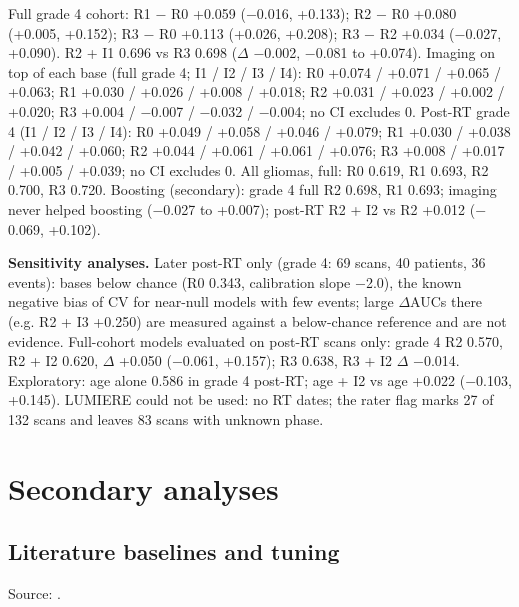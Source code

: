 \documentclass[11pt,a4paper]{article}
\begin{document}
Full grade 4 cohort: R1 $-$ R0 +0.059 ($-$0.016, +0.133); R2 $-$ R0 +0.080 (+0.005, +0.152); R3 $-$ R0 +0.113
(+0.026, +0.208); R3 $-$ R2 +0.034 ($-$0.027, +0.090). R2 + I1 0.696 vs R3 0.698 ($\Delta$ $-$0.002, $-$0.081
to +0.074). Imaging on top of each base (full grade 4; I1 / I2 / I3 / I4): R0 +0.074 / +0.071 / +0.065 /
+0.063; R1 +0.030 / +0.026 / +0.008 / +0.018; R2 +0.031 / +0.023 / +0.002 / +0.020; R3 +0.004 / $-$0.007 /
$-$0.032 / $-$0.004; no CI excludes 0. Post-RT grade 4 (I1 / I2 / I3 / I4): R0 +0.049 / +0.058 / +0.046 /
+0.079; R1 +0.030 / +0.038 / +0.042 / +0.060; R2 +0.044 / +0.061 / +0.061 / +0.076; R3 +0.008 / +0.017 /
+0.005 / +0.039; no CI excludes 0. All gliomas, full: R0 0.619, R1 0.693, R2 0.700, R3 0.720. Boosting
(secondary): grade 4 full R2 0.698, R1 0.693; imaging never helped boosting ($-$0.027 to +0.007); post-RT R2 +
I2 vs R2 +0.012 ($-$0.069, +0.102).

\textbf{Sensitivity analyses.} Later post-RT only (grade 4: 69 scans, 40 patients, 36 events): bases below
chance (R0 0.343, calibration slope $-$2.0), the known negative bias of CV for near-null models with few
events; large $\Delta$AUCs there (e.g. R2 + I3 +0.250) are measured against a below-chance reference and are
not evidence. Full-cohort models evaluated on post-RT scans only: grade 4 R2 0.570, R2 + I2 0.620, $\Delta$
+0.050 ($-$0.061, +0.157); R3 0.638, R3 + I2 $\Delta$ $-$0.014. Exploratory: age alone 0.586 in grade 4
post-RT; age + I2 vs age +0.022 ($-$0.103, +0.145). LUMIERE could not be used: no RT dates; the rater flag
marks 27 of 132 scans and leaves 83 scans with unknown phase.

\FloatBarrier
\section[Secondary analyses: baselines, sensitivity, imbalance, schedule, feature conflicts, SHAP, calibration and
utility]{Secondary analyses}\label{sec:S12}

\subsection{Literature baselines and tuning}\label{sec:S12.1}

Source: .
\end{document}
